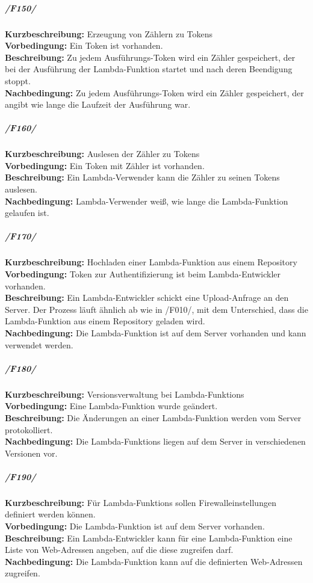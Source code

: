 \documentclass[a4paper,20pt,oneside]{book}
\begin{document}
\subparagraph{/F150/}
\textbf{Kurzbeschreibung:} Erzeugung von Zählern zu \Glspl{Token}
\\
\textbf{Vorbedingung:} Ein \Gls{Token} ist vorhanden.
\\
\textbf{Beschreibung:} Zu jedem Ausführungs-\Gls{Token} wird ein Zähler gespeichert, der bei der Ausführung der \gls{Lambda-Funktion} startet und nach deren Beendigung stoppt. 
\\
\textbf{Nachbedingung:} Zu jedem Ausführungs-\Gls{Token} wird ein Zähler gespeichert, der angibt wie lange die Laufzeit der Ausführung war.

\subparagraph{/F160/}
\textbf{Kurzbeschreibung:} Auslesen der Zähler zu \Glspl{Token}
\\
\textbf{Vorbedingung:} Ein \Gls{Token} mit Zähler ist vorhanden.
\\
\textbf{Beschreibung:} Ein \Gls{Lambda-Verwender} kann die Zähler zu seinen \glspl{Token} auslesen.
\\
\textbf{Nachbedingung:} \Gls{Lambda-Verwender} weiß, wie lange die \gls{Lambda-Funktion} gelaufen ist.

\subparagraph{/F170/}
\textbf{Kurzbeschreibung:} Hochladen einer \Gls{Lambda-Funktion} aus einem \Gls{Repository}
\\
\textbf{Vorbedingung:} \Gls{Token} zur Authentifizierung ist beim \Gls{Lambda-Entwickler} vorhanden.
\\
\textbf{Beschreibung:} Ein \Gls{Lambda-Entwickler} schickt eine Upload-Anfrage an den \Gls{Server}. Der Prozess läuft ähnlich ab wie in /F010/, mit dem Unterschied, dass die \Gls{Lambda-Funktion} aus einem \Gls{Repository} geladen wird.
\\
\textbf{Nachbedingung:} Die \Gls{Lambda-Funktion} ist auf dem \Gls{Server} vorhanden und kann verwendet werden.

\subparagraph{/F180/}
\textbf{Kurzbeschreibung:} Versionsverwaltung bei \Glspl{Lambda-Funktion}
\\
\textbf{Vorbedingung:} Eine \Gls{Lambda-Funktion} wurde geändert.
\\
\textbf{Beschreibung:} Die Änderungen an einer \Gls{Lambda-Funktion} werden vom \Gls{Server} protokolliert.
\\
\textbf{Nachbedingung:} Die \Glspl{Lambda-Funktion} liegen auf dem \Gls{Server} in verschiedenen Versionen vor.

\subparagraph{/F190/}
\textbf{Kurzbeschreibung:} Für \Glspl{Lambda-Funktion} sollen Firewalleinstellungen definiert werden können.
\\
\textbf{Vorbedingung:} Die \Gls{Lambda-Funktion} ist auf dem \Gls{Server} vorhanden.
\\
\textbf{Beschreibung:} Ein \Gls{Lambda-Entwickler} kann für eine \Gls{Lambda-Funktion} eine Liste von Web-Adressen angeben, auf die diese zugreifen darf.
\\
\textbf{Nachbedingung:} Die \Gls{Lambda-Funktion} kann auf die definierten Web-Adressen zugreifen.
\end{document}
